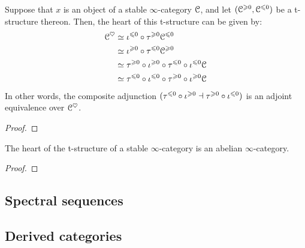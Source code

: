         \begin{corollary} \label{coro: short_exact_sequences_and_truncations}
            Suppose that $x$ is an object of a stable $\infty$-category $\mathcal{C}$, and let $(\mathcal{C}^{\geqslant 0}, \mathcal{C}^{\leqslant 0})$ be a t-structure thereon. Then, the heart of this t-structure can be given by:
                $$
                    \begin{aligned}
                        \mathcal{C}^{\heartsuit} & \simeq \iota^{\leqslant 0} \circ \tau^{\geqslant 0} \mathcal{C}^{\leqslant 0}
                        \\
                        & \simeq \iota^{\geqslant 0} \circ \tau^{\leqslant 0} \mathcal{C}^{\geqslant 0} 
                        \\
                        & \simeq \tau^{\geqslant 0} \circ \iota^{\geqslant 0} \circ \tau^{\leqslant 0} \circ \iota^{\leqslant 0} \mathcal{C} 
                        \\
                        & \simeq \tau^{\leqslant 0} \circ \iota^{\leqslant 0} \circ \tau^{\geqslant 0} \circ \iota^{\geqslant 0} \mathcal{C}
                    \end{aligned}
                $$
            In other words, the composite adjunction $(\tau^{\leqslant 0} \circ \iota^{\geqslant 0} \dashv \tau^{\geqslant 0} \circ \iota^{\leqslant 0})$ is an adjoint equivalence over $\mathcal{C}^{\heartsuit}$. 
        \end{corollary}
            \begin{proof}
                
            \end{proof}
        
        \begin{theorem} \label{theorem: hearts_are_abelian} 
            The heart of the t-structure of a stable $\infty$-category is an abelian $\infty$-category.
        \end{theorem}
            \begin{proof}
                
            \end{proof}
            
    \subsection{Spectral sequences}

    \subsection{Derived categories}